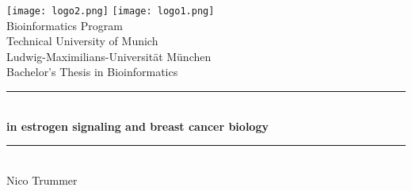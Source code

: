 \documentclass[pdftex,12pt,a4paper]{report}
\newcommand{\HRule}{\rule{\linewidth}{0.5mm}}
\begin{document}
\setcounter{tocdepth}{4}



\begin{titlepage}

    \begin{center}

        \texttt{[image: logo2.png]}
        \hfill
        \texttt{[image: logo1.png]}
        \\[5cm]

        {\Large Bioinformatics Program}\\[0.5cm]
        {\Large Technical University of Munich}\\[0.5cm]
        {\Large Ludwig-Maximilians-Universit\"at M\"unchen}\\[2cm]
        {\Large Bachelor's Thesis in Bioinformatics}\\[1.5cm]

        \HRule \\[0.4cm]
        { \huge \bfseries {} in estrogen signaling and breast
        cancer
        biology}\\[0.4cm]

        \HRule \\[1.5cm]

        {\Large Nico Trummer}\\[2.5cm]

        \vfill
    \end{center}
\end{titlepage}
\end{document}
